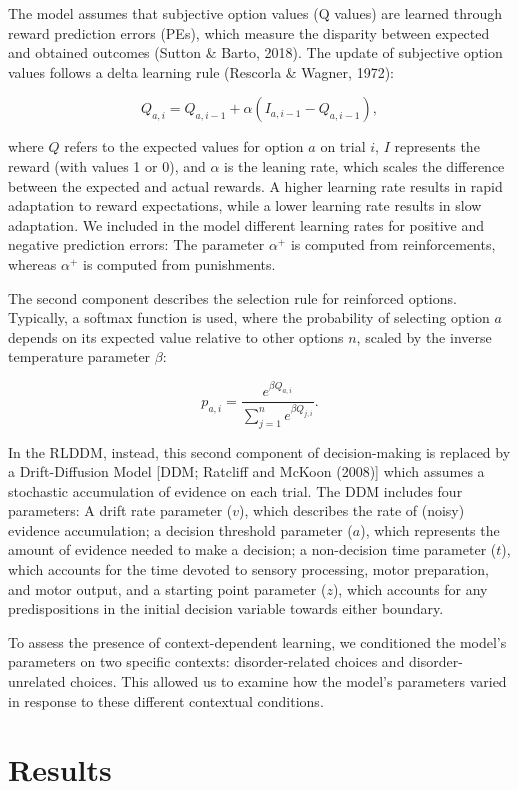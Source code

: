\documentclass[
  man,floatsintext]{apa6}
\begin{document}
The model assumes that subjective option values (Q values) are learned through reward prediction errors (PEs), which measure the disparity between expected and obtained outcomes (Sutton \& Barto, 2018). The update of subjective option values follows a delta learning rule (Rescorla \& Wagner, 1972):

\[
Q_{a, i} = Q_{a, i-1} + \alpha (I_{a, i-1} - Q_{a, i-1}),
\]

\noindent
where \(Q\) refers to the expected values for option \(a\) on trial \(i\), \(I\) represents the reward (with values 1 or 0), and \(\alpha\) is the leaning rate, which scales the difference between the expected and actual rewards. A higher learning rate results in rapid adaptation to reward expectations, while a lower learning rate results in slow adaptation. We included in the model different learning rates for positive and negative prediction errors: The parameter \(\alpha^+\) is computed from reinforcements, whereas \(\alpha^+\) is computed from punishments.

The second component describes the selection rule for reinforced options. Typically, a softmax function is used, where the probability of selecting option \(a\) depends on its expected value relative to other options \(n\), scaled by the inverse temperature parameter \(\beta\):

\[
p_{a,i} = \frac{e^{\beta Q_{a,i}}}{\sum_{j=1}^n e^{\beta Q_{j,i}}}.
\]

In the RLDDM, instead, this second component of decision-making is replaced by a Drift-Diffusion Model {[}DDM; Ratcliff and McKoon (2008){]} which assumes a stochastic accumulation of evidence on each trial. The DDM includes four parameters: A drift rate parameter (\(v\)), which describes the rate of (noisy) evidence accumulation; a decision threshold parameter (\(a\)), which represents the amount of evidence needed to make a decision; a non-decision time parameter (\(t\)), which accounts for the time devoted to sensory processing, motor preparation, and motor output, and a starting point parameter (\(z\)), which accounts for any predispositions in the initial decision variable towards either boundary.

To assess the presence of context-dependent learning, we conditioned the model's parameters on two specific contexts: disorder-related choices and disorder-unrelated choices. This allowed us to examine how the model's parameters varied in response to these different contextual conditions.

\hypertarget{results}{%
\section{Results}\label{results}}
\end{document}
